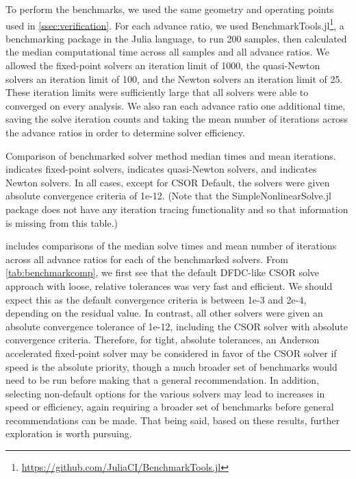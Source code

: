 To perform the benchmarks, we used the same geometry and operating points used in \cref{ssec:verification}.
%
For each advance ratio, we used BenchmarkTools.jl\footnote{\url{https://github.com/JuliaCI/BenchmarkTools.jl}}, a benchmarking package in the Julia language, to run 200 samples, then calculated the median computational time across all samples and all advance ratios.
%
We allowed the fixed-point solvers an iteration limit of 1000, the quasi-Newton solvers an iteration limit of 100, and the Newton solvers an iteration limit of 25.
%
These iteration limits were sufficiently large that all solvers were able to converged on every analysis.
%
We also ran each advance ratio one additional time, saving the solve iteration counts and taking the mean number of iterations across the advance ratios in order to determine solver efficiency.
%

\renewcommand{\arraystretch}{1.5}
\begin{table}[h!]
    \caption{
    Comparison of benchmarked solver method median times and mean iterations.
     indicates fixed-point solvers,  indicates quasi-Newton solvers, and  indicates Newton solvers.
    In all cases, except for CSOR Default, the solvers were given absolute convergence criteria of 1e-12.
    (Note that the SimpleNonlinearSolve.jl package does not have any iteration tracing functionality and so that information is missing from this table.)
    }
    \begin{center}
        
    \end{center}
    \label{tab:benchmarkcomp}
\end{table}


 includes comparisons of the median solve times and mean number of iterations across all advance ratios for each of the benchmarked solvers.
%
From \cref{tab:benchmarkcomp}, we first see that the default DFDC-like CSOR solve approach with loose, relative tolerances was very fast and efficient.
%
We should expect this as the default convergence criteria is between 1e-3 and 2e-4, depending on the residual value. %
%
In contrast, all other solvers were given an absolute convergence tolerance of 1e-12, including the CSOR solver with absolute convergence criteria. %
%
Therefore, for tight, absolute tolerances, an Anderson accelerated fixed-point solver may be considered in favor of the CSOR solver if speed is the absolute priority, though a much broader set of benchmarks would need to be run before making that a general recommendation.
%
In addition, selecting non-default options for the various solvers may lead to increases in speed or efficiency, again requiring a broader set of benchmarks before general recommendations can be made.
%
That being said, based on these results, further exploration is worth pursuing.


